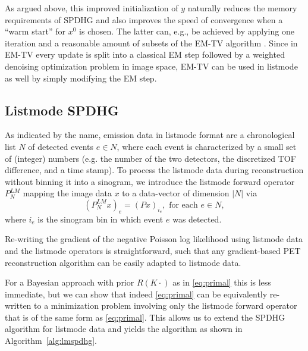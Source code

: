 As argued above, this improved initialization of $y$ naturally reduces the 
memory requirements of SPDHG and also improves the speed of convergence when a
``warm start'' for $x^0$ is chosen. 
The latter can, e.g., be achieved by applying one iteration
and a reasonable amount of subsets of the EM-TV algorithm \cite{Sawatzky2008, Burger2008}.
Since in EM-TV every update is split into a classical EM step followed by a weighted denoising
optimization problem in image space, EM-TV can be used in listmode as well by simply
modifying the EM step.

\subsection*{Listmode SPDHG}

As indicated by the name, emission data in listmode format are a chronological list $N$ of detected 
events $e \in N$, where each event is characterized by a small set of (integer) numbers 
(e.g. the number of the two detectors, the discretized TOF difference, and a time stamp).
To process the listmode data during reconstruction without binning it into a sinogram,
we introduce the listmode forward operator $P^{LM}_N$ mapping the image data $x$ to a 
data-vector of dimension $|N|$ via 
%
\begin{equation}
(P^{LM}_N x)_e  = (Px)_{i_e} , \text{ for each }e \in N,
\label{eq:lmop}
\end{equation}
%
where $i_e$ is the sinogram bin in which event $e$ was detected.

Re-writing the gradient of the negative Poisson log likelihood using listmode data and the
listmode operators is straightforward, such that any gradient-based PET reconstruction algorithm 
can be easily adapted to listmode data.

For a Bayesian approach with prior $R(K \cdot)$ as in \eqref{eq:primal} this is less immediate, 
but we can show that indeed \eqref{eq:primal} can be equivalently re-written to a minimization 
problem involving only the listmode forward operator that is of the same form as \eqref{eq:primal}. 
This allows us to extend the SPDHG algorithm for listmode data and yields the algorithm as shown 
in Algorithm~\ref{alg:lmspdhg}.

